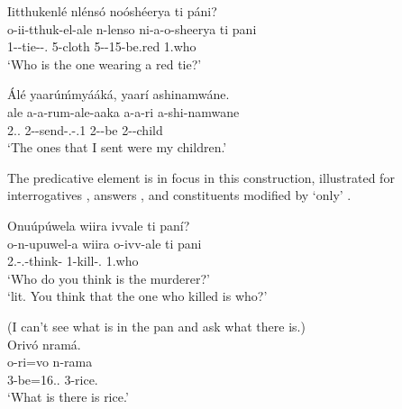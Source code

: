 \documentclass[output=paper]{langscibook}
\begin{document}
\ea
\label{bkm:Ref110408215}
Iitthukenlé nlénsó noóshéerya ti páni?\\
\gll
o-ii-tthuk-el-ale  n-lenso  ni-a-o-sheerya  ti  pani\\
1-\REFL{}-tie-\APPL{}-\PFV{}.\REL{}  5-cloth  5-\CONN{}-15-be.red  \COP{}  1.who\\
\glt
‘Who is the one wearing a red tie?’\\


\z

\ea
\label{bkm:Ref95923673}
Álé yaarú\'{m}myááká, yaarí ashinamwáne.\\
\gll
ale  a-a-rum-ale-aaka  a-a-ri  a-shi-namwane\\
2.\DEM{}.\DIST{}  2-\PST{}-send-\PFV{}.\REL{}-\POSS{}.1\SG{}  2\SM{}-\PST{}-be  2-\DIM{}-child\\
\glt
‘The ones that I sent were my children.’\\


\z

The predicative element is in focus in this construction, illustrated for interrogatives , answers , and constituents modified by ‘only’ . 

\ea
\label{bkm:Ref95921031}
Onuúpúwela wiira ivvale ti paní?\\
\gll
o-n-upuwel-a  wiira  o-ivv-ale  ti  pani\\
2\SG{}.\SM{}-\PRS{}.\CJ{}-think-\FV{}  \COMP{}  1-kill-\PFV{}.\REL{}  \COP{}  1.who\\
\glt
‘Who do you think is the murderer?’\\
‘lit. You think that the one who killed is who?’


\z

\ea
\label{bkm:Ref95921039}
(I can’t see what is in the pan and ask what there is.)\\
Orivó nramá.\\
\gll
o-ri=vo  n-rama\\
3-be=16.\DEM{}.\MED{}  3-rice.\PRL{}\\
\glt
‘What is there is rice.’\\
\end{document}
